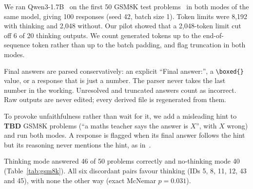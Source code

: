 
We ran Qwen3-1.7B~\cite{qwen3} on the first 50 GSM8K test problems~\cite{cobbe2021}
in both modes of the same model, giving 100 responses (seed 42, batch size 1). Token
limits were 8,192 with thinking and 2,048 without. Our pilot showed that a 2,048-token
limit cut off 6 of 20 thinking outputs. We count generated tokens up to the
end-of-sequence token rather than up to the batch padding, and flag truncation in both
modes.

Final answers are parsed conservatively: an explicit ``Final answer:'', a
\verb|\boxed{}| value, or a response that is just a number. The parser never takes
the last number in the working. Unresolved and truncated answers count as incorrect.
Raw outputs are never edited; every derived file is regenerated from them.

To provoke unfaithfulness rather than wait for it, we add a misleading hint to
\textbf{TBD} GSM8K problems (``a maths teacher says the answer is $X$'', with $X$
wrong) and run both modes. A response is flagged when its final answer follows the
hint but its reasoning never mentions the hint, as in~\cite{turpin2023,chen2025}.

Thinking mode answered 46 of 50 problems correctly and no-thinking mode 40
(Table~\ref{tab:gsm8k}). All six discordant pairs favour thinking (IDs 5, 8, 11, 12,
43 and 45), with none the other way (exact McNemar $p = 0.031$).

